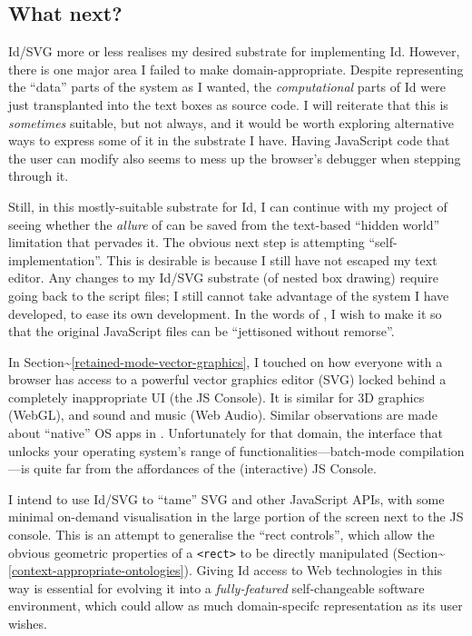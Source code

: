 \hypertarget{what-next}{%
\subsection{What next?}\label{what-next}}

Id{}/SVG more or less realises my desired substrate for implementing
Id{}. However, there is one major area I failed to make
domain-appropriate. Despite representing the ``data'' parts of the
system as I wanted, the \emph{computational} parts of Id{} were just
transplanted into the text boxes as source code. I will reiterate that
this is \emph{sometimes} suitable, but not always, and it would be worth
exploring alternative ways to express some of it in the substrate I
have. Having JavaScript code that the user can modify also seems to mess
up the browser's debugger when stepping through it.

Still, in this mostly-suitable substrate for Id{}, I can continue with
my project of seeing whether the \emph{allure} of \cite{COLAs} can be
saved from the text-based ``hidden world'' limitation that pervades it.
The obvious next step is attempting ``self-implementation''. This is
desirable is because I still have not escaped my text editor. Any
changes to my Id{}/SVG substrate (of nested box drawing) require going
back to the script files; I still cannot take advantage of the system I
have developed, to ease its own development. In the words of
\cite{COLAs}, I wish to make it so that the original JavaScript files
can be ``jettisoned without remorse''.

In Section\textasciitilde{}\ref{retained-mode-vector-graphics}, I
touched on how everyone with a browser has access to a powerful vector
graphics editor (SVG) locked behind a completely inappropriate UI (the
JS Console). It is similar for 3D graphics (WebGL), and sound and music
(Web Audio). Similar observations are made about ``native'' OS apps in
\cite{prog21-dyn}. Unfortunately for that domain, the interface that
unlocks your operating system's range of functionalities---batch-mode
compilation---is quite far from the affordances of the (interactive) JS
Console.

I intend to use Id{}/SVG to ``tame'' SVG and other JavaScript APIs, with
some minimal on-demand visualisation in the large portion of the screen
next to the JS console. This is an attempt to generalise the ``rect
controls'', which allow the obvious geometric properties of a
\texttt{\textless{}rect\textgreater{}} to be directly manipulated
(Section\textasciitilde{}\ref{context-appropriate-ontologies}). Giving
Id{} access to Web technologies in this way is essential for evolving it
into a \emph{fully-featured} self-changeable software environment, which
could allow as much domain-specifc representation as its user wishes.
